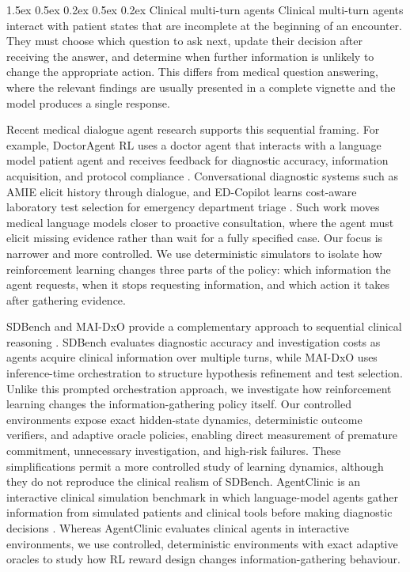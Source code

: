 \documentclass{article}
\makeatletter
\renewcommand{\paragraph}{%
  \@startsection{paragraph}{4}{\z@}%
                {1.5ex \@plus 0.5ex \@minus 0.2ex}%
                {0.5ex \@plus 0.2ex}%
                {\normalsize\bf}}
\makeatother
\begin{document}
\paragraph{Clinical multi-turn agents}
Clinical multi-turn agents interact with patient states that are incomplete at
the beginning of an encounter. They must choose which question to ask next,
update their decision after receiving the answer, and determine when further
information is unlikely to change the appropriate action. This differs from
medical question answering, where the relevant findings are usually presented
in a complete vignette and the model produces a single response.

Recent medical dialogue agent research supports this sequential framing. For
example, DoctorAgent RL uses a doctor agent that interacts with a language model
patient agent and receives feedback for diagnostic accuracy, information
acquisition, and protocol compliance \citep{feng2026doctoragentrl}. Conversational
diagnostic systems such as AMIE \citep{tu2024amie} elicit history through dialogue, and
ED-Copilot learns cost-aware laboratory test selection for emergency department
triage \citep{sun2024edcopilot}. Such work
moves medical language models closer to proactive consultation, where the agent
must elicit missing evidence rather than wait for a fully specified case. Our
focus is narrower and more controlled. We use deterministic simulators to isolate
how reinforcement learning changes three parts of the policy: which information
the agent requests, when it stops requesting information, and which action it
takes after gathering evidence.

SDBench and MAI-DxO provide a complementary approach to sequential
clinical reasoning \citep{nori2025sequential}. SDBench evaluates
diagnostic accuracy and investigation costs as agents acquire clinical
information over multiple turns, while MAI-DxO uses inference-time
orchestration to structure hypothesis refinement and test selection.
Unlike this prompted orchestration approach, we investigate how
reinforcement learning changes the information-gathering policy itself.
Our controlled environments expose exact hidden-state dynamics,
deterministic outcome verifiers, and adaptive oracle policies, enabling
direct measurement of premature commitment, unnecessary investigation,
and high-risk failures. These simplifications permit a more controlled
study of learning dynamics, although they do not reproduce the clinical
realism of SDBench.
AgentClinic is an interactive clinical simulation benchmark in which
language-model agents gather information from simulated patients and clinical
tools before making diagnostic decisions \citep{schmidgall2026agentclinic}.
Whereas AgentClinic evaluates clinical agents in interactive environments, we use
controlled, deterministic environments with exact adaptive oracles to study how
RL reward design changes information-gathering behaviour.
\end{document}
